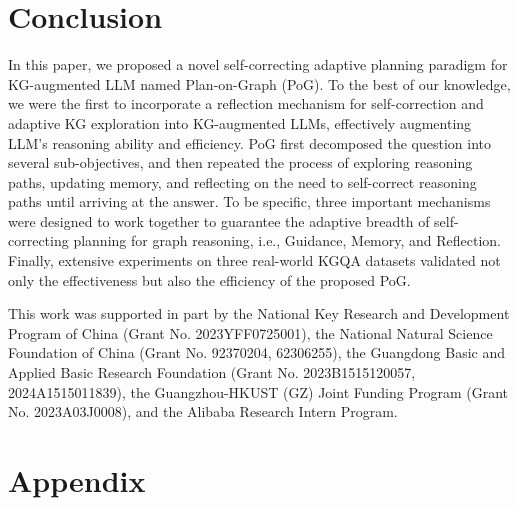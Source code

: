 \documentclass{article}
\begin{document}

\vspace{-2mm}
\section{Conclusion}
\vspace{-2mm}
In this paper, we proposed a novel self-correcting adaptive planning paradigm for KG-augmented LLM named Plan-on-Graph (PoG).
To the best of our knowledge, we were the first to incorporate a reflection mechanism for self-correction and adaptive KG exploration into KG-augmented LLMs, effectively augmenting LLM's reasoning ability and efficiency.
PoG first decomposed the question into several sub-objectives, and then repeated the process of exploring reasoning paths, updating memory, and reflecting on the need to self-correct reasoning paths until arriving at the answer.
To be specific, three important mechanisms were designed to work together to guarantee the adaptive breadth of self-correcting planning for graph reasoning, i.e., Guidance, Memory, and Reflection.
Finally, extensive experiments on three real-world KGQA datasets validated not only the effectiveness but also the efficiency of the proposed PoG.

\vspace{-2mm}
\begin{ack}
\vspace{-2mm}
This work was supported in part by the National Key Research and Development Program of China (Grant No. 2023YFF0725001), the National Natural Science Foundation of China (Grant No. 92370204, 62306255), the Guangdong Basic and Applied Basic Research Foundation (Grant No. 2023B1515120057, 2024A1515011839), the Guangzhou-HKUST (GZ) Joint Funding Program (Grant No. 2023A03J0008), and the Alibaba Research Intern Program.
\end{ack}






\newpage
\appendix


\appendix
\section*{Appendix}
\setcounter{section}{0}
\renewcommand\thesection{\Alph{section}}
\end{document}
